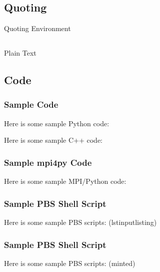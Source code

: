 \documentclass[aspectratio=1610]{beamer}
\begin{document}
\subsection{Quoting}
\begin{frame}{Quoting Environment}
  \lipsum[3]
  \begin{quote}
    \lipsum[4]
  \end{quote}
\end{frame}



\subsection{}
\begin{frame}{Plain Text}
  \lipsum[1]
\end{frame}



\subsection*{Code}
\begin{frame}
  \frametitle{Sample Code}

  Here is some sample Python code:
  

  Here is some sample C++ code:
  
\end{frame}



\begin{frame}
  \frametitle{Sample mpi4py Code}
  Here is some sample MPI/Python code:
\end{frame}



\begin{frame}%
  \frametitle{Sample PBS Shell Script}
  Here is some sample PBS scripts: (lstinputlisting)
  
\end{frame}
\begin{frame}%
  \frametitle{Sample PBS Shell Script}
  Here is some sample PBS scripts: (minted)
  \inputminted[bgcolor=BackgroundBlue3]{bash}{snippets/PBS/hello_world_PBS.sh}
\end{frame}



\begin{frame}
  \inputminted[bgcolor=BackgroundBlue3]{console}{snippets/terminal/whoami.session}
\end{frame}


\begin{frame}
  \vspace{3em}
  \hspace{1em}\layout{}
\end{frame}
\end{document}
